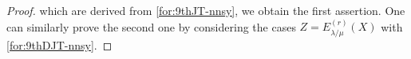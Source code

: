 \documentclass[12pt]{amsart}%
\theoremstyle{definition}
\newtheorem{remark}[theorem]{Remark}
\begin{document}
\begin{proof}
which are derived from \eqref{for:9thJT-nnsy},
we obtain the first assertion.
One can similarly prove the second one by considering the cases $Z=E^{(r)}_{\lambda/\mu}(X)
$ with \eqref{for:9thDJT-nnsy}.
\end{proof}

\end{document}
